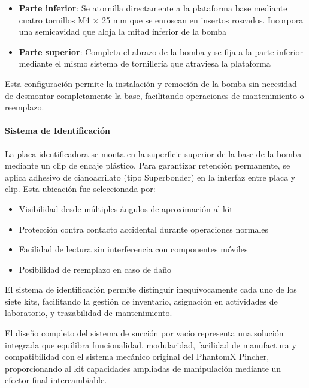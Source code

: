 \begin{itemize}
    \item \textbf{Parte inferior}: Se atornilla directamente a la plataforma base mediante cuatro tornillos M4 × 25 mm que se enroscan en insertos roscados. Incorpora una semicavidad que aloja la mitad inferior de la bomba
    \item \textbf{Parte superior}: Completa el abrazo de la bomba y se fija a la parte inferior mediante el mismo sistema de tornillería que atraviesa la plataforma
\end{itemize}

Esta configuración permite la instalación y remoción de la bomba sin necesidad de desmontar completamente la base, facilitando operaciones de mantenimiento o reemplazo.

\paragraph{Sistema de Identificación}

La placa identificadora se monta en la superficie superior de la base de la bomba mediante un clip de encaje plástico. Para garantizar retención permanente, se aplica adhesivo de cianoacrilato (tipo Superbonder) en la interfaz entre placa y clip. Esta ubicación fue seleccionada por:

\begin{itemize}
    \item Visibilidad desde múltiples ángulos de aproximación al kit
    \item Protección contra contacto accidental durante operaciones normales
    \item Facilidad de lectura sin interferencia con componentes móviles
    \item Posibilidad de reemplazo en caso de daño
\end{itemize}

El sistema de identificación permite distinguir inequívocamente cada uno de los siete kits, facilitando la gestión de inventario, asignación en actividades de laboratorio, y trazabilidad de mantenimiento.

El diseño completo del sistema de succión por vacío representa una solución integrada que equilibra funcionalidad, modularidad, facilidad de manufactura y compatibilidad con el sistema mecánico original del PhantomX Pincher, proporcionando al kit capacidades ampliadas de manipulación mediante un efector final intercambiable.